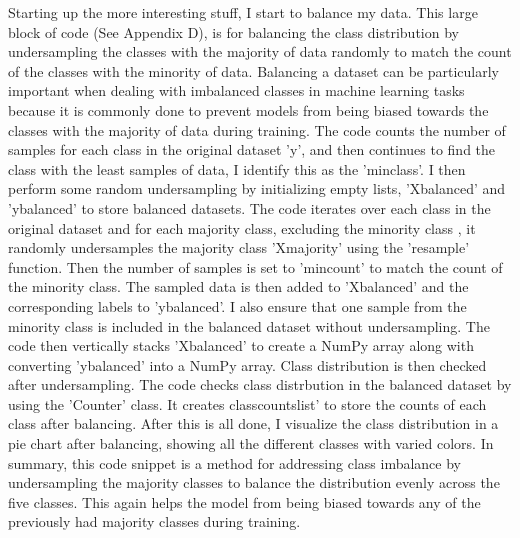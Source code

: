 \documentclass[paper=a4, fontsize=11pt,twoside]{scrartcl}
\begin{document}
Starting up the more interesting stuff, I start to balance my data. This large block of code (See Appendix D), is for balancing the class distribution by undersampling the classes with the majority of data randomly to match the count of the classes with the minority of data. Balancing a dataset can be particularly important when dealing with imbalanced classes in machine learning tasks because it is commonly done to prevent models from being biased towards the classes with the majority of data during training. The code counts the number of samples for each class in the original dataset 'y', and then continues to find the class with the least samples of data, I identify this as the 'min\textunderscore class'. I then perform some random undersampling by initializing empty lists, 'X\textunderscore balanced' and 'y\textunderscore balanced' to store balanced datasets. The code iterates over each class in the original dataset and for each majority class, excluding the minority class , it randomly undersamples the majority class 'X\textunderscore majority' using the 'resample' function. Then the number of samples is set to 'min\textunderscore count' to match the count of the minority class. The sampled data is then added to 'X\textunderscore balanced' and the corresponding labels to 'y\textunderscore balanced'. I also ensure that one sample from the minority class is included in the balanced dataset without undersampling. The code then vertically stacks 'X\textunderscore balanced' to create a NumPy array along with converting 'y\textunderscore balanced' into a NumPy array. Class distribution is then checked after undersampling. The code checks class distrbution in the balanced dataset by using the 'Counter' class. It creates class\textunderscore counts\textunderscore list' to store the counts of each class after balancing. After this is all done, I visualize the class distribution in a pie chart after balancing, showing all the different classes with varied colors. In summary, this code snippet is a method for addressing class imbalance by undersampling the majority classes to balance the distribution evenly across the five classes. This again helps the model from being biased towards any of the previously had majority classes during training.  \\
\end{document}

